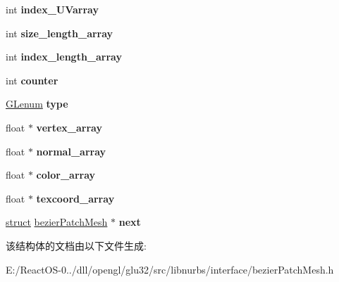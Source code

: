 \begin{DoxyCompactItemize}
\item 
\mbox{\label{structbezier_patch_mesh_a57875b78492d78f9a93490c616f71248}} 
int {\bfseries index\+\_\+\+U\+Varray}
\item 
\mbox{\label{structbezier_patch_mesh_a50fd0fc00481f927c1210a354dc00d31}} 
int {\bfseries size\+\_\+length\+\_\+array}
\item 
\mbox{\label{structbezier_patch_mesh_af28568db028c93aa682dc354965d5049}} 
int {\bfseries index\+\_\+length\+\_\+array}
\item 
\mbox{\label{structbezier_patch_mesh_a78480701a360cf4f601cc4a41c68729f}} 
int {\bfseries counter}
\item 
\mbox{\label{structbezier_patch_mesh_a098a9da8935d0e73f8b5153ea5e50e53}} 
\hyperlink{interfacevoid}{G\+Lenum} {\bfseries type}
\item 
\mbox{\label{structbezier_patch_mesh_a8b0e93e7aa512ff4d1c4fec64e9cef6f}} 
float $\ast$ {\bfseries vertex\+\_\+array}
\item 
\mbox{\label{structbezier_patch_mesh_a4b56254ef1468c51f0b20802abc8462f}} 
float $\ast$ {\bfseries normal\+\_\+array}
\item 
\mbox{\label{structbezier_patch_mesh_aeb10b3bd4a0334aab836c7c1c52826bc}} 
float $\ast$ {\bfseries color\+\_\+array}
\item 
\mbox{\label{structbezier_patch_mesh_aa2222858d2bcddf476e48474bfcc373d}} 
float $\ast$ {\bfseries texcoord\+\_\+array}
\item 
\mbox{\label{structbezier_patch_mesh_a0ba984836e97d20bac90fb2d96a764f5}} 
\hyperlink{interfacestruct}{struct} \hyperlink{structbezier_patch_mesh}{bezier\+Patch\+Mesh} $\ast$ {\bfseries next}
\end{DoxyCompactItemize}


该结构体的文档由以下文件生成\+:\begin{DoxyCompactItemize}
\item 
E\+:/\+React\+O\+S-\/0../dll/opengl/glu32/src/libnurbs/interface/bezier\+Patch\+Mesh.\+h\end{DoxyCompactItemize}
